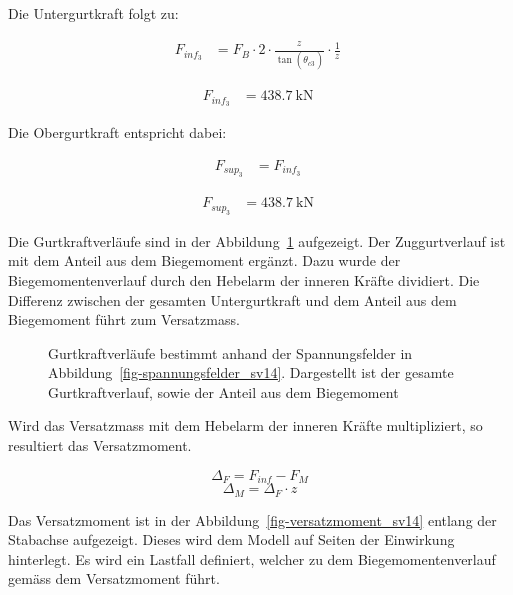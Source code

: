 \documentclass[
  11pt,
  letterpaper,
]{scrreprt}
\begin{document}
Die Untergurtkraft folgt zu:

$$
\begin{aligned}
F_{inf_{3}} &= F_{B} \cdot 2 \cdot \frac{ z_{_{}} }{ \tan \left( \theta_{c3_{_{}}} \right) } \cdot \frac{1} { z_{_{}} } \; 
\end{aligned}
$$

$$
\begin{aligned}
F_{inf_{3}} &= 438.7\ \mathrm{kN} \;
\end{aligned}
$$

Die Obergurtkraft entspricht dabei:

$$
\begin{aligned}
F_{sup_{3}} &= F_{inf_{3}} \; 
\end{aligned}
$$

$$
\begin{aligned}
F_{sup_{3}} &= 438.7\ \mathrm{kN} \;
\end{aligned}
$$

Die Gurtkraftverläufe sind in der Abbildung~\ref{fig-gurtkraft_sv14}
aufgezeigt. Der Zuggurtverlauf ist mit dem Anteil aus dem Biegemoment
ergänzt. Dazu wurde der Biegemomentenverlauf durch den Hebelarm der
inneren Kräfte dividiert. Die Differenz zwischen der gesamten
Untergurtkraft und dem Anteil aus dem Biegemoment führt zum Versatzmass.

\begin{figure}[H]


\caption{\label{fig-gurtkraft_sv14}Gurtkraftverläufe bestimmt anhand der
Spannungsfelder in Abbildung~\ref{fig-spannungsfelder_sv14}. Dargestellt
ist der gesamte Gurtkraftverlauf, sowie der Anteil aus dem Biegemoment}

\end{figure}%

Wird das Versatzmass mit dem Hebelarm der inneren Kräfte multipliziert,
so resultiert das Versatzmoment.

\[
\Delta_F = F_{inf} - F_M
\] \[
\Delta_M = \Delta_F \cdot z
\]

Das Versatzmoment ist in der Abbildung~\ref{fig-versatzmoment_sv14}
entlang der Stabachse aufgezeigt. Dieses wird dem Modell auf Seiten der
Einwirkung hinterlegt. Es wird ein Lastfall definiert, welcher zu dem
Biegemomentenverlauf gemäss dem Versatzmoment führt.
\end{document}
